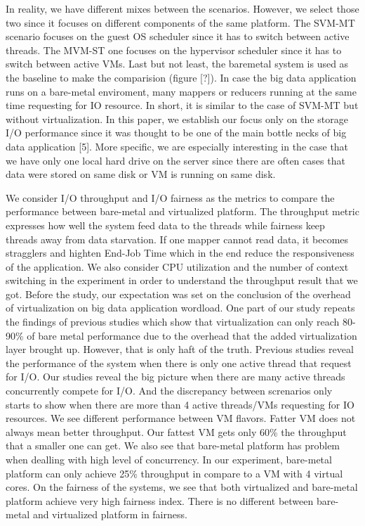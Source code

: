 \documentclass{acmsig}
\begin{document}
In reality, we have different mixes between the scenarios. However, we select those two since it focuses on different components of the same platform. The SVM-MT scenario focuses on the guest OS scheduler since it has to switch between active threads. The MVM-ST one focuses on the hypervisor scheduler since it has to switch between active VMs. Last but not least, the baremetal system is used as the baseline to make the comparision (figure [?]). In case the big data application runs on a bare-metal enviroment, many mappers or reducers running at the same time requesting for IO resource. In short, it is similar to the case of SVM-MT but without virtualization. In this paper, we establish our focus only on the storage I/O performance since it was thought to be one of the main bottle necks of big data application [5]. More specific, we are especially interesting in the case that we have only one local hard drive on the server since there are often cases that data were stored on same disk or VM is running on same disk.

We consider I/O throughput and I/O fairness as the metrics to compare the performance between bare-metal and virtualized platform. The throughput metric expresses how well the system feed data to the threads while fairness keep threads away from data starvation. If one mapper cannot read data, it becomes stragglers and highten End-Job Time which in the end reduce the responsiveness of the application. We also consider CPU utilization and the number of context switching in the experiment in order to understand the throughput result that we got. Before the study, our expectation was set on the conclusion of the overhead of virtualization on big data application wordload. One part of our study repeats the findings of previous studies which show that virtualization can only reach 80-90\% of bare metal performance due to the overhead that the added virtualization layer brought up. However, that is only haft of the truth. Previous studies reveal the performance of the system when there is only one active thread that request for I/O. Our studies reveal the big picture when there are many active threads concurrently compete for I/O. And the discrepancy between screnarios only starts to show when there are more than 4 active threads/VMs requesting for IO resources. We see different performance between VM flavors. Fatter VM does not always mean better throughput. Our fattest VM gets only 60\% the throughput that a smaller one can get. We also see that bare-metal platform has problem when dealling with high level of concurrency. In our experiment, bare-metal platform can only achieve 25\% throughput in compare to a VM with 4 virtual cores. On the fairness of the systems, we see that both virtualized and bare-metal platform achieve very high fairness index. There is no different between bare-metal and virtualized platform in fairness.
\end{document}
